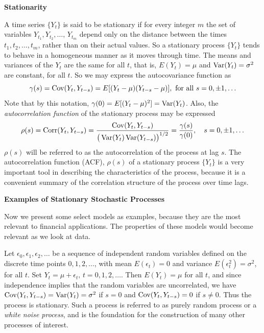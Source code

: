 \noindent\textbf{Stationarity} \twomedskip


A time series $\{Y_t \}$ is said to be stationary if for every integer $m$ the set of variables $Y_{t_1}, Y_{t_2}, \ldots, \, Y_{t_m}$ depend only on the distance between the times $t_1, t_2, \ldots, t_m$, rather than on their actual values.  So a stationary process $\{Y_t \}$ tends to behave in a homogeneous manner as it moves through time. The means and variances of the $Y_t$ are the same for all $t$, that is, $E(Y_t) = \mu$ and  $\operatorname{Var}(Y_t)= \sigma^2$ are constant, for all $t$. So we may express the autocovariance function as 
	\begin{equation} \label{eqn:2gammas}
	\gamma(s)= \cov(Y_t,Y_{t - s})= E[(Y_t - \mu)(Y_{t - s} - \mu)], \text{ for all } s= 0, \pm 1, \ldots
	\end{equation}
Note that by this notation, $\gamma(0) = E[(Y_t - \mu)^2] = \operatorname{Var}(Y_t)$. Also, the \emph{autocorrelation function} of the stationary process may be expressed
        	\begin{equation} \label{eqn:2rhos}
	\rho(s)= \corr(Y_t,Y_{t - s})= \dfrac{\cov(Y_t,Y_{t - s})}{\big( \var(Y_t) \var(Y_{t-s}) \big)^{1/2}} = \dfrac{\gamma(s)}{\gamma(0)},  \quad  s= 0, \pm 1, \ldots
	\end{equation}
$\rho(s)$ will be referred to as the autocorrelation of the process at lag $s$. The autocorrelation function (ACF), $\rho(s)$ of a stationary process $\{Y_t\}$ is a very important tool in describing the characteristics of the process, because it is a convenient summary of the correlation structure of the process over time lags.  \twomedskip


\noindent \textbf{Examples of Stationary Stochastic Processes} \twomedskip


Now we present some select models as examples, because they are the most relevant to financial applications. The properties of these models would become relevant as we look at data. 


\begin{ex} \label{ex:whitenoise} Let $\epsilon_0, \epsilon_1, \epsilon_2, \ldots$ be a sequence of independent random variables defined on the discrete time points $0,1, 2, \ldots$, with mean $E(\epsilon_{t})= 0$ and variance $E(\epsilon_{t}^2)= \sigma^2$, for all $t$. Set $Y_t = \mu + \epsilon_t, \, t= 0, 1, 2, \ldots$. Then $E(Y_t)= \mu$ for all $t$, and since independence implies that the random variables are uncorrelated, we have $\operatorname{Cov}(Y_t,Y_{t-s})= \operatorname{Var}(Y_t)= \sigma^2$ if $s=0$ and $\operatorname{Cov}(Y_t,Y_{t-s})= 0$ if $s \neq 0$. Thus the process is stationary. Such a process is referred to as purely random process or a \emph{white noise process}, and is the foundation for the construction of many other processes of interest. \xqed
\end{ex}


